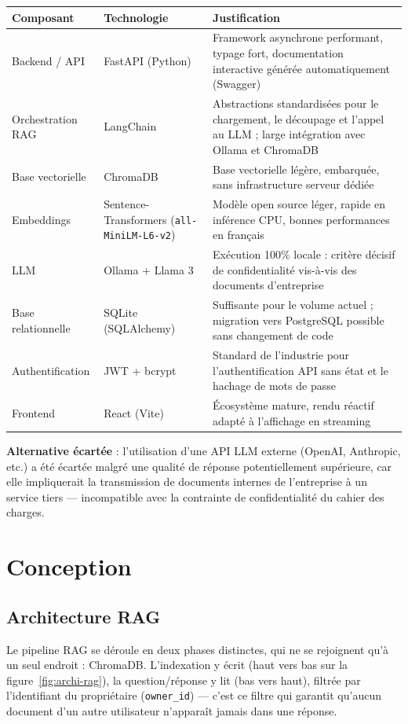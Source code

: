 \documentclass[12pt,a4paper]{article}
\begin{document}
\begin{table}[h]
\centering
\small
\begin{tabular}{|l|l|p{6.5cm}|}
\hline
\textbf{Composant} & \textbf{Technologie} & \textbf{Justification} \\
\hline
Backend / API & FastAPI (Python) & Framework asynchrone performant, typage fort, documentation interactive générée automatiquement (Swagger) \\
Orchestration RAG & LangChain & Abstractions standardisées pour le chargement, le découpage et l'appel au LLM ; large intégration avec Ollama et ChromaDB \\
Base vectorielle & ChromaDB & Base vectorielle légère, embarquée, sans infrastructure serveur dédiée \\
Embeddings & Sentence-Transformers (\texttt{all-MiniLM-L6-v2}) & Modèle open source léger, rapide en inférence CPU, bonnes performances en français \\
LLM & Ollama + Llama 3 & Exécution 100\% locale : critère décisif de confidentialité vis-à-vis des documents d'entreprise \\
Base relationnelle & SQLite (SQLAlchemy) & Suffisante pour le volume actuel ; migration vers PostgreSQL possible sans changement de code \\
Authentification & JWT + bcrypt & Standard de l'industrie pour l'authentification API sans état et le hachage de mots de passe \\
Frontend & React (Vite) & Écosystème mature, rendu réactif adapté à l'affichage en streaming \\
\hline
\end{tabular}
\end{table}

\textbf{Alternative écartée} : l'utilisation d'une API LLM externe (OpenAI, Anthropic, etc.) a été écartée malgré une qualité de réponse potentiellement supérieure, car elle impliquerait la transmission de documents internes de l'entreprise à un service tiers — incompatible avec la contrainte de confidentialité du cahier des charges.

\section{Conception}

\subsection{Architecture RAG}
Le pipeline RAG se déroule en deux phases distinctes, qui ne se rejoignent qu'à un seul
endroit : ChromaDB. L'indexation y écrit (haut vers bas sur la figure~\ref{fig:archi-rag}),
la question/réponse y lit (bas vers haut), filtrée par l'identifiant du propriétaire
(\texttt{owner\_id}) — c'est ce filtre qui garantit qu'aucun document d'un autre utilisateur
n'apparaît jamais dans une réponse.
\end{document}
